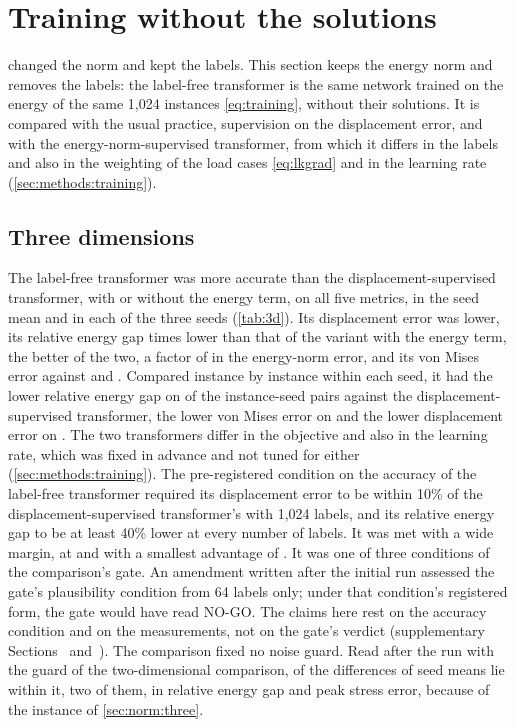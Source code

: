 \section{Training without the solutions}\label{sec:labelfree}

 changed the norm and kept the labels. This section keeps the energy norm and
removes the labels: the label-free transformer is the same network trained on the energy of
the same 1,024 instances \eqref{eq:training}, without their solutions. It is compared with the usual practice, supervision on the displacement error, and with the
energy-norm-supervised transformer, from which it differs in the labels and also in the
weighting of the load cases \eqref{eq:lkgrad} and in the learning rate
(\cref{sec:methods:training}).

\subsection{Three dimensions}\label{sec:labelfree:three}

The label-free transformer was more accurate than the displacement-supervised transformer,
with or without the energy term, on all five metrics, in the seed mean and in each of the three seeds (\cref{tab:3d}). Its displacement error was
\numThreeFreeDispAdvantage{} lower, its relative energy gap \numThreeAncOverFreeGap{} times
lower than that of the variant with
the energy term, the better of the two, a factor of \numThreeAncOverFreeGapRoot{} in the
energy-norm error, and its von Mises error \numThreeFreeVm{} against \numThreeLabVm{} and
\numThreeAncVm{}. Compared instance by instance within each seed, it had the lower relative
energy gap on \numPairThreeLabGap{} of the \numThreePairs{} instance-seed pairs against the
displacement-supervised transformer, the lower von Mises error on \numPairThreeLabVm{} and
the lower displacement error on \numPairThreeLabDisp{}. The two transformers differ in the
objective and also in the learning rate, which was fixed in advance and not tuned for either
(\cref{sec:methods:training}). The pre-registered condition on the accuracy of the
label-free transformer required its displacement error to be within 10\% of the
displacement-supervised transformer's with 1,024 labels, and its relative energy gap to be
at least 40\% lower at every number of labels. It was met with a wide margin, at
\numGTwoParity{} and with a smallest advantage of \numGTwoAdvMin{}. It was one of three conditions of the comparison's gate. An amendment written after the
initial run assessed the gate's plausibility condition from 64 labels only; under that
condition's registered form, the gate would have read NO-GO. The claims here rest on the accuracy condition and on the measurements, not on the
gate's verdict (supplementary Sections~\SuppPrereg{} and~\SuppThree{}). The comparison fixed no noise guard. Read after the run with the guard of the two-dimensional
comparison, \numThreeGuardWithin{} of the \numThreeGuardTotal{} differences of seed means lie
within it, two of them, in relative energy gap and peak stress error, because of the instance
of \cref{sec:norm:three}.

